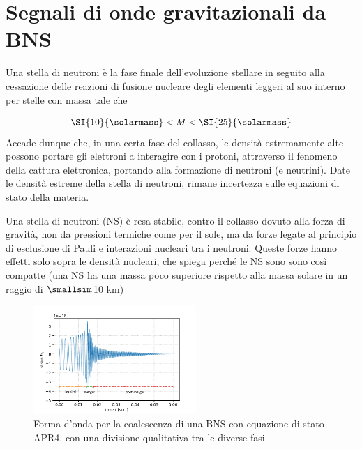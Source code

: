 
\chapter[Segnali di GW da BNS]{Segnali di onde gravitazionali da BNS}
\label{chapter:segnaleGWdaBNS}
%    

Una stella di neutroni è la fase finale dell'evoluzione stellare in seguito alla cessazione delle reazioni di fusione nucleare degli elementi leggeri al suo interno
per stelle con massa tale che

\begin{equation}
   	\SI{10}{\solarmass} < M < \SI{25}{\solarmass}
   	\label{eqn:massNS}
\end{equation}
Accade dunque che, in una certa fase del collasso, le densità estremamente alte possono portare gli elettroni a interagire con i protoni, attraverso il fenomeno della cattura elettronica, portando alla formazione di neutroni (e neutrini). Date le densità estreme della stella di neutroni, rimane incertezza sulle equazioni di stato della materia.\cite{hobson2006general}

Una stella di neutroni (NS) è resa stabile, contro il collasso dovuto alla forza di gravità, non da pressioni termiche come per il sole, ma da forze legate al principio di esclusione di Pauli e interazioni nucleari tra i neutroni. Queste forze hanno effetti solo sopra le densità nucleari, che spiega perché le NS sono sono così compatte (una NS ha una massa poco superiore rispetto alla massa solare in un raggio di $\smallsim$10 km)\cite{hartle2003gravity}



\begin{figure}
	\vspace{-15pt}
	\begin{center}
		\includegraphics[width=0.55\textwidth]{figures/Capitolo_1/APR4.pdf}
	\end{center}
	\vspace{-10pt}
	\caption{Forma d'onda per la coalescenza di una BNS con equazione di stato APR4, con una divisione qualitativa tra le diverse fasi}
	\label{fig:forma_onda_APR4}
	\vspace{-10pt}
\end{figure}


